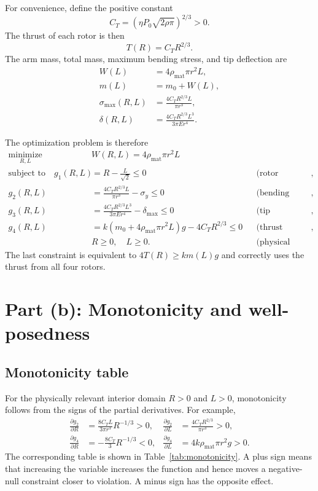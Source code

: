 \documentclass[11pt]{article}
\begin{document}
For convenience, define the positive constant
\begin{equation}
 C_T=\left(\eta P_0\sqrt{2\rho\pi}\right)^{2/3}>0.
\end{equation}
The thrust of each rotor is then
\begin{equation}
 T(R)=C_T R^{2/3}.
\end{equation}
The arm mass, total mass, maximum bending stress, and tip deflection are
\begin{align}
 W(L) &=4\rho_{\mathrm{mat}}\pi r^2L, \\
 m(L) &=m_0+W(L), \\
 \sigma_{\max}(R,L)&=\frac{4C_TR^{2/3}L}{\pi r^3}, \\
 \delta(R,L)&=\frac{4C_TR^{2/3}L^3}{3\pi Er^4}.
\end{align}

The optimization problem is therefore
\begin{align}
 \underset{R,L}{\operatorname{minimize}}\quad & W(R,L)=4\rho_{\mathrm{mat}}\pi r^2L \\
 \text{subject to}\quad
 g_1(R,L)&=R-\frac{L}{\sqrt{2}}\leq0 && \text{(rotor clearance)},\\
 g_2(R,L)&=\frac{4C_TR^{2/3}L}{\pi r^3}-\sigma_y\leq0 && \text{(bending stress)},\\
 g_3(R,L)&=\frac{4C_TR^{2/3}L^3}{3\pi Er^4}-\delta_{\max}\leq0 && \text{(tip deflection)},\\
 g_4(R,L)&=k\left(m_0+4\rho_{\mathrm{mat}}\pi r^2L\right)g-4C_TR^{2/3}\leq0 && \text{(thrust margin)},\\
 &R\geq0,\quad L\geq0. && \text{(physical variable bounds)}
\end{align}
The last constraint is equivalent to $4T(R)\geq k m(L)g$ and correctly uses the thrust from all four rotors.

\section{Part (b): Monotonicity and well-posedness}

\subsection{Monotonicity table}
For the physically relevant interior domain $R>0$ and $L>0$, monotonicity follows from the signs of the partial derivatives. For example,
\begin{align}
 \frac{\partial g_2}{\partial R}
 &=\frac{8C_TL}{3\pi r^3}R^{-1/3}>0, &
 \frac{\partial g_2}{\partial L}
 &=\frac{4C_TR^{2/3}}{\pi r^3}>0,\\
 \frac{\partial g_4}{\partial R}
 &=-\frac{8C_T}{3}R^{-1/3}<0, &
 \frac{\partial g_4}{\partial L}
 &=4k\rho_{\mathrm{mat}}\pi r^2g>0.
\end{align}
The corresponding table is shown in Table~\ref{tab:monotonicity}. A plus sign means that increasing the variable increases the function and hence moves a negative-null constraint closer to violation. A minus sign has the opposite effect.
\end{document}
